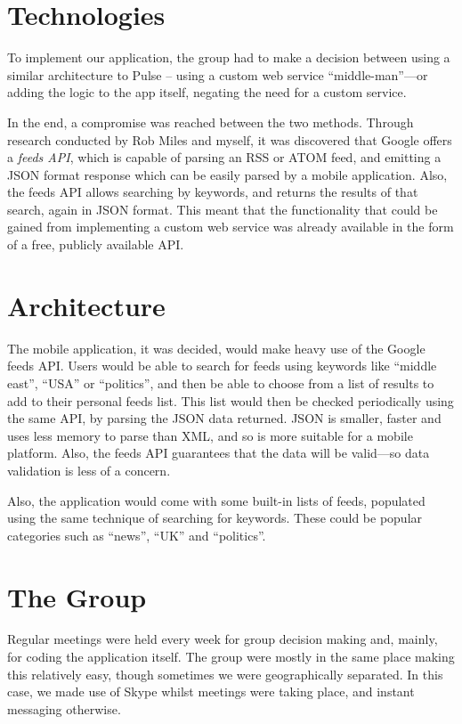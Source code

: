 \documentclass[a4paper,11pt]{article}
\begin{document}
    \section{Technologies}

    To implement our application, the group had to make a decision between
    using a similar architecture to Pulse – using a custom web service
    ``middle-man''---or adding the logic to the app itself, negating the need
    for a custom service.

    In the end, a compromise was reached between the two methods. Through
    research conducted by Rob Miles and myself, it was discovered that Google
    offers a \emph{feeds API}, which is capable of parsing an RSS or ATOM feed,
    and emitting a JSON format response which can be easily parsed by a mobile
    application. Also, the feeds API allows searching by keywords, and returns
    the results of that search, again in JSON format. This meant that the
    functionality that could be gained from implementing a custom web service
    was already available in the form of a free, publicly available API.

    \section{Architecture}

    The mobile application, it was decided, would make heavy use of the Google
    feeds API. Users would be able to search for feeds using keywords like
    ``middle east'', ``USA'' or ``politics'', and then be able to choose from
    a list of results to add to their personal feeds list. This list would then
    be checked periodically using the same API, by parsing the JSON data
    returned. JSON is smaller, faster and uses less memory to parse than XML,
    and so is more suitable for a mobile platform. Also, the feeds API
    guarantees that the data will be valid---so data validation is less of
    a concern.

    Also, the application would come with some built-in lists of feeds,
    populated using the same technique of searching for keywords. These could
    be popular categories such as ``news'', ``UK'' and ``politics''.

    \section{The Group}

    Regular meetings were held every week for group decision making and,
    mainly, for coding the application itself. The group were mostly in the
    same place making this relatively easy, though sometimes we were
    geographically separated. In this case, we made use of Skype whilst
    meetings were taking place, and instant messaging otherwise.
\end{document}
